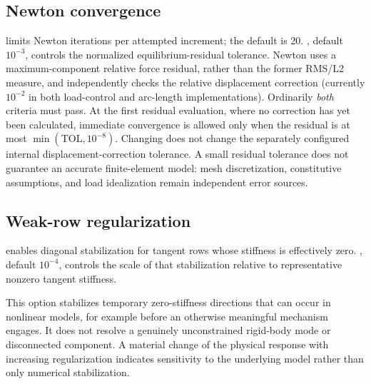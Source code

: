 \subsection*{Newton convergence}

 limits Newton iterations per attempted increment; the default is 20. , default \(10^{-3}\), controls the normalized equilibrium-residual tolerance. Newton uses a maximum-component relative force residual, rather than the former RMS/L2 measure, and independently checks the relative displacement correction (currently \(10^{-2}\) in both load-control and arc-length implementations). Ordinarily \emph{both} criteria must pass. At the first residual evaluation, where no correction has yet been calculated, immediate convergence is allowed only when the residual is at most \(\min(\mathrm{TOL},10^{-8})\). Changing  does not change the separately configured internal displacement-correction tolerance. A small residual tolerance does not guarantee an accurate finite-element model: mesh discretization, constitutive assumptions, and load idealization remain independent error sources.

\subsection*{Weak-row regularization}

 enables diagonal stabilization for tangent rows whose stiffness is effectively zero. , default \(10^{-4}\), controls the scale of that stabilization relative to representative nonzero tangent stiffness.

This option stabilizes temporary zero-stiffness directions that can occur in nonlinear models, for example before an otherwise meaningful mechanism engages. It does not resolve a genuinely unconstrained rigid-body mode or disconnected component. A material change of the physical response with increasing regularization indicates sensitivity to the underlying model rather than only numerical stabilization.

